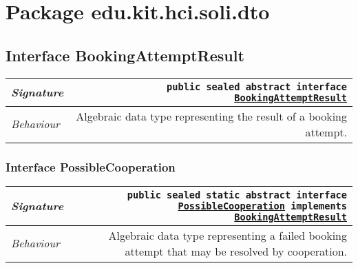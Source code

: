 

\section{Package edu.kit.hci.soli.dto}
\begin{adjustwidth}{1.5em}{0pt}
  \subsection{Interface BookingAttemptResult\label{edu.kit.hci.soli.dto.BookingAttemptResult} }
  \begin{adjustwidth}{1.5em}{0pt}
    {\begin{tabularx}{1.0\linewidth}{@{}l R@{}}
      \emph{Signature} & \texttt{public sealed abstract  interface \texttt{\hyperref[edu.kit.hci.soli.dto.BookingAttemptResult]{\texttt{BookingAttemptResult}}}} \\
      \hline
      \emph{Behaviour} & Algebraic data type representing the result of a booking attempt.  \\
      \hline
  
    \end{tabularx}}\subsubsection{Interface PossibleCooperation\label{edu.kit.hci.soli.dto.BookingAttemptResult.PossibleCooperation} }
    \begin{adjustwidth}{1.5em}{0pt}
      {\begin{tabularx}{1.0\linewidth}{@{}l R@{}}
        \emph{Signature} & \texttt{public sealed static abstract  interface \texttt{\hyperref[edu.kit.hci.soli.dto.BookingAttemptResult.PossibleCooperation]{\texttt{PossibleCooperation}} implements \texttt{\hyperref[edu.kit.hci.soli.dto.BookingAttemptResult]{\texttt{BookingAttemptResult}}}}} \\
        \hline
        \emph{Behaviour} & Algebraic data type representing a failed booking attempt that may be resolved by cooperation.  \\
        \hline
  

\end{tabularx}}
\end{adjustwidth}
\end{adjustwidth}
\end{adjustwidth}
